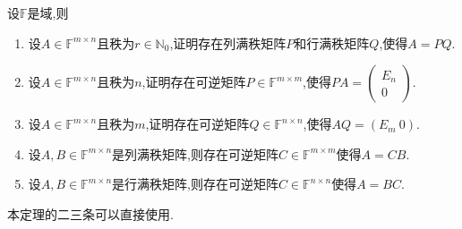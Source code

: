 \documentclass[../../main.tex]{subfiles}%
\begin{document}
\begin{theorem}[满秩分解]\label{theorem:满秩分解}
设\( \mathbb{F} \)是域,则
\begin{enumerate}
\item 设\( A \in \mathbb{F}^{m \times n} \)且秩为\( r \in \mathbb{N}_0 \),证明存在列满秩矩阵\( P \)和行满秩矩阵\( Q \),使得\( A = PQ \).

\item 设\( A \in \mathbb{F}^{m \times n} \)且秩为\( n \),证明存在可逆矩阵\( P \in \mathbb{F}^{m \times m} \),使得\( PA = \begin{pmatrix} E_n \\ 0 \end{pmatrix} \).

\item 设\( A \in \mathbb{F}^{m \times n} \)且秩为\( m \),证明存在可逆矩阵\( Q \in \mathbb{F}^{n \times n} \),使得\( AQ = (E_m\ 0) \).

\item 设\( A, B \in \mathbb{F}^{m \times n} \)是列满秩矩阵,则存在可逆矩阵\( C \in \mathbb{F}^{m \times m} \)使得\( A = CB \).

\item 设\( A, B \in \mathbb{F}^{m \times n} \)是行满秩矩阵,则存在可逆矩阵\( C \in \mathbb{F}^{n \times n} \)使得\( A = BC \).
\end{enumerate}
\end{theorem}
\begin{note}
本定理的二三条可以直接使用.
\end{note}
\end{document}
